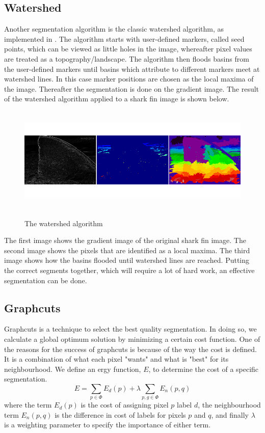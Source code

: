 \documentclass[a4paper,10pt]{article}
\begin{document}
\subsection{Watershed}
Another segmentation algorithm is the classic watershed algorithm, as
implemented in \cite{scikit}.  The algorithm starts with user-defined markers,
called seed points, which can be viewed as little holes in the image, whereafter
pixel values are treated as a topography/landscape.  The algorithm then floods
basins from the user-defined markers until basins which attribute to different
markers meet at watershed lines.  In this case marker positions are chosen as
the local maxima of the image.  Thereafter the segmentation is done on the
gradient image.  The result of the watershed algorithm applied to a shark fin
image is shown below.

\begin{figure}[H]
\centering
\includegraphics[width=5in,height=2in]{watershed.png} 
\label{fig1}
\caption{The watershed algorithm}
\end{figure}

\noindent The first image shows the gradient image of the original shark fin
image.  The second image shows the pixels that are identified as a local maxima.
 The third image shows how the basins flooded until watershed lines are reached.
 Putting the correct segments together, which will require a lot of hard work,
an effective segmentation can be done.

\subsection{Graphcuts}
Graphcuts is a technique to select the best quality segmentation.  In doing so, we calculate a global optimum solution by minimizing a certain 
cost function.  One of the reasons for the success of graphcuts is because of the way the cost is defined.  It is a combination of what each pixel
"wants" and what is "best" for its neighbourhood.  We define an ergy function, $E$, to determine the cost of a specific segmentation.
\[
 E = \sum_{p \in \Phi}E_d(p) + \lambda\sum_{p,g \in \Phi}E_n(p, q)
\]
where the term $E_d(p)$ is the cost of assigning pixel $p$ label $d$, the neighbourhood term $E_n(p, q)$ is the difference in cost of labels for pixels $p$ 
and $q$, and finally $\lambda$ is a weighting parameter to specify the importance of either term.
\end{document}
